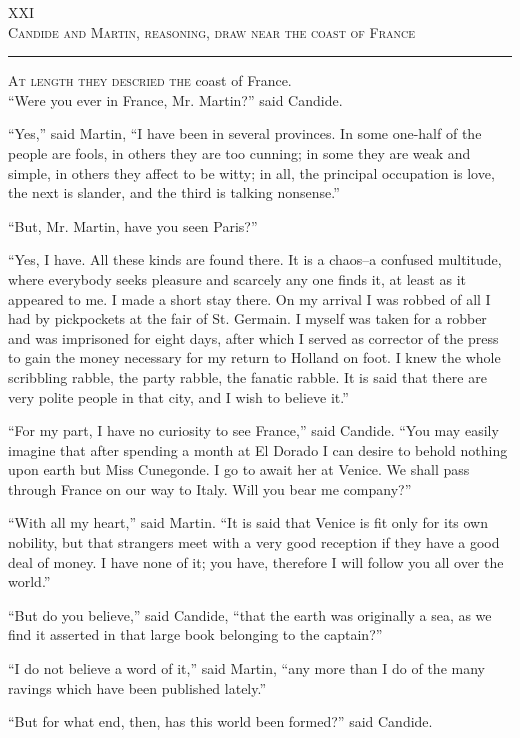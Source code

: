 \begin{center}
XXI\\
\textsc{Candide and Martin, reasoning,  draw near the coast of France}
\end{center}
\vspace{-0.5cm}
\rule{\textwidth}{0.5pt}
\lettrine{A}{t length they descried the} coast of France.
\\
``Were you ever in France, Mr. Martin?'' said Candide.

``Yes,'' said Martin, ``I have been in several provinces. In some one-half of the people are fools, in others they are too cunning; in some they are weak and simple, in others they affect to be witty; in all, the principal occupation is love, the next is slander, and the third is talking nonsense.''

``But, Mr. Martin, have you seen Paris?''

``Yes, I have. All these kinds are found there. It is a chaos--a confused multitude, where everybody seeks pleasure and scarcely any one finds it, at least as it appeared to me. I made a short stay there. On my arrival I was robbed of all I had by pickpockets at the fair of St. Germain. I myself was taken for a robber and was imprisoned for eight days, after which I served as corrector of the press to gain the money necessary for my return to Holland on foot. I knew the whole scribbling rabble, the party rabble, the fanatic rabble. It is said that there are very polite people in that city, and I wish to believe it.''

``For my part, I have no curiosity to see France,'' said Candide. ``You may easily imagine that after spending a month at El Dorado I can desire to behold nothing upon earth but Miss Cunegonde. I go to await her at Venice. We shall pass through France on our way to Italy. Will you bear me company?''

``With all my heart,'' said Martin. ``It is said that Venice is fit only for its own nobility, but that strangers meet with a very good reception if they have a good deal of money. I have none of it; you have, therefore I will follow you all over the world.''

``But do you believe,'' said Candide, ``that the earth was originally a sea, as we find it asserted in that large book belonging to the captain?''

``I do not believe a word of it,'' said Martin, ``any more than I do of the many ravings which have been published lately.''

``But for what end, then, has this world been formed?'' said Candide.

